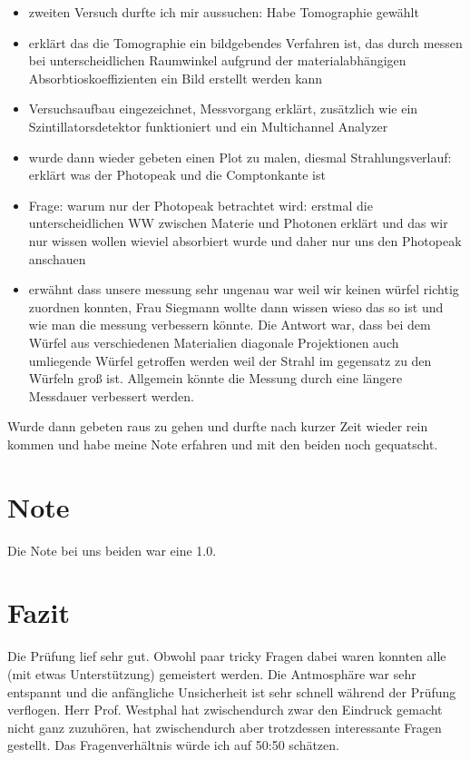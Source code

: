 \documentclass[
  bibliography=totoc,     %
  captions=tableheading,  %
  titlepage=firstiscover, %
]{scrartcl}
\begin{document}
\begin{itemize}
    \item zweiten Versuch durfte ich mir aussuchen: Habe Tomographie gewählt 
    \item erklärt das die Tomographie ein bildgebendes Verfahren ist, das durch messen bei unterscheidlichen Raumwinkel aufgrund der materialabhängigen Absorbtioskoeffizienten
        ein Bild erstellt werden kann 
    \item Versuchsaufbau eingezeichnet, Messvorgang erklärt, zusätzlich wie ein Szintillatorsdetektor funktioniert und ein Multichannel Analyzer
    \item wurde dann wieder gebeten einen Plot zu malen, diesmal Strahlungsverlauf: erklärt was der Photopeak und die Comptonkante ist
    \item Frage: warum nur der Photopeak betrachtet wird: erstmal die unterscheidlichen WW zwischen Materie und Photonen erklärt und das wir nur wissen wollen wieviel absorbiert wurde und daher nur uns den Photopeak anschauen
    \item erwähnt dass unsere messung sehr ungenau war weil wir keinen würfel richtig zuordnen konnten, Frau Siegmann wollte dann wissen wieso das so ist und wie man die messung verbessern könnte.
    Die Antwort war, dass bei dem Würfel aus verschiedenen Materialien diagonale Projektionen auch umliegende Würfel getroffen werden weil der Strahl im gegensatz zu den Würfeln groß ist.
    Allgemein könnte die Messung durch eine längere Messdauer verbessert werden.
\end{itemize}

Wurde dann gebeten raus zu gehen und durfte nach kurzer Zeit wieder rein kommen und habe meine Note erfahren und mit den beiden noch gequatscht.

\section{Note}
Die Note bei uns beiden war eine 1.0.

\section{Fazit}
Die Prüfung lief sehr gut. Obwohl paar tricky Fragen dabei waren konnten alle (mit etwas Unterstützung) gemeistert werden. Die Antmosphäre war
sehr entspannt und die anfängliche Unsicherheit ist sehr schnell während der Prüfung verflogen. Herr Prof. Westphal hat zwischendurch zwar den Eindruck gemacht
nicht ganz zuzuhören, hat zwischendurch aber trotzdessen interessante Fragen gestellt. Das Fragenverhältnis würde ich auf 50:50 schätzen.
\end{document}
